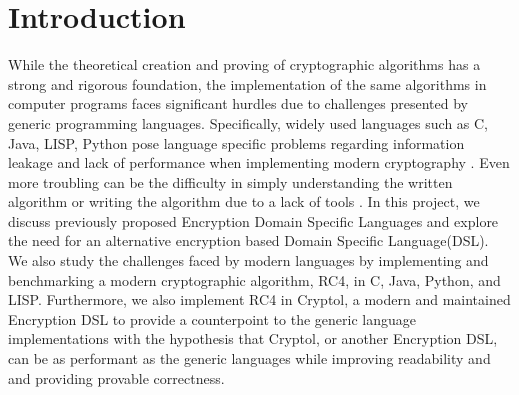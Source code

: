 \section{Introduction}
While the theoretical creation and proving of cryptographic algorithms has a strong and rigorous foundation, the implementation of the same algorithms in computer programs faces significant hurdles due to challenges presented by generic programming languages. Specifically, widely used languages such as C, Java, LISP, Python pose language specific problems regarding information leakage and lack of performance when implementing modern cryptography \cite{Lewis}. Even more troubling can be the difficulty in simply understanding the written algorithm or writing the algorithm due to a lack of tools \cite{Agosta}. In this project, we discuss previously proposed Encryption Domain Specific Languages and explore the need for an alternative encryption based Domain Specific Language(DSL).  We also study the challenges faced by modern languages by implementing and benchmarking a modern cryptographic algorithm, RC4, in C, Java, Python, and LISP. Furthermore, we also implement RC4 in Cryptol, a modern and maintained Encryption DSL to provide a counterpoint to the generic language implementations with the hypothesis that Cryptol, or another Encryption DSL, can be as performant as the generic languages while improving readability and and providing provable correctness.

